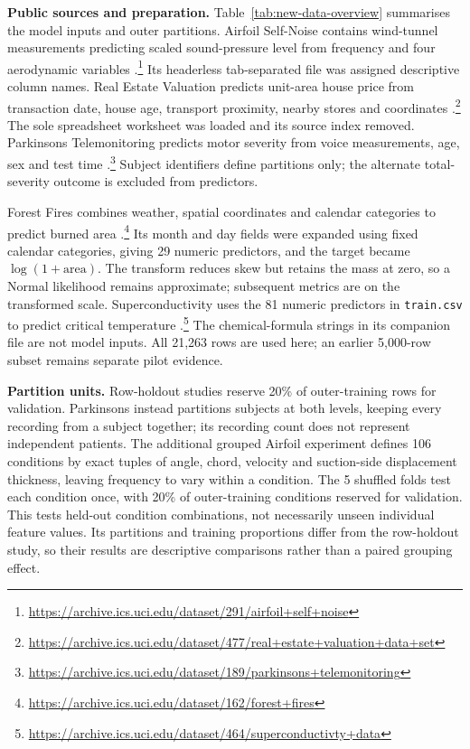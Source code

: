 \textbf{Public sources and preparation.}
Table~\ref{tab:new-data-overview} summarises the model inputs and outer partitions.
Airfoil Self-Noise contains wind-tunnel measurements predicting scaled sound-pressure level from frequency and four aerodynamic variables \cite{uci-airfoil}.\footnote{\url{https://archive.ics.uci.edu/dataset/291/airfoil+self+noise}}
Its headerless tab-separated file was assigned descriptive column names.
Real Estate Valuation predicts unit-area house price from transaction date, house age, transport proximity, nearby stores and coordinates \cite{uci-real-estate}.\footnote{\url{https://archive.ics.uci.edu/dataset/477/real+estate+valuation+data+set}}
The sole spreadsheet worksheet was loaded and its source index removed.
Parkinsons Telemonitoring predicts motor severity from voice measurements, age, sex and test time \cite{uci-parkinsons}.\footnote{\url{https://archive.ics.uci.edu/dataset/189/parkinsons+telemonitoring}}
Subject identifiers define partitions only; the alternate total-severity outcome is excluded from predictors.

Forest Fires combines weather, spatial coordinates and calendar categories to predict burned area \cite{uci-forest-fires}.\footnote{\url{https://archive.ics.uci.edu/dataset/162/forest+fires}}
Its month and day fields were expanded using fixed calendar categories, giving 29 numeric predictors, and the target became $\log(1+\mathrm{area})$.
The transform reduces skew but retains the mass at zero, so a Normal likelihood remains approximate; subsequent metrics are on the transformed scale.
Superconductivity uses the 81 numeric predictors in \texttt{train.csv} to predict critical temperature \cite{uci-superconductivity}.\footnote{\url{https://archive.ics.uci.edu/dataset/464/superconductivty+data}}
The chemical-formula strings in its companion file are not model inputs.
All 21{,}263 rows are used here; an earlier 5{,}000-row subset remains separate pilot evidence.

\textbf{Partition units.}
Row-holdout studies reserve 20\% of outer-training rows for validation.
Parkinsons instead partitions subjects at both levels, keeping every recording from a subject together; its recording count does not represent independent patients.
The additional grouped Airfoil experiment defines 106 conditions by exact tuples of angle, chord, velocity and suction-side displacement thickness, leaving frequency to vary within a condition.
The 5 shuffled folds test each condition once, with 20\% of outer-training conditions reserved for validation.
This tests held-out condition combinations, not necessarily unseen individual feature values.
Its partitions and training proportions differ from the row-holdout study, so their results are descriptive comparisons rather than a paired grouping effect.

